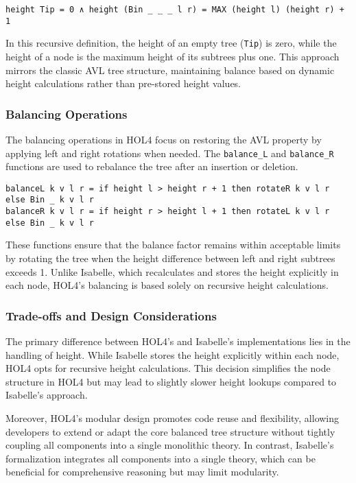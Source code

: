 \documentclass[12pt]{article}
\begin{document}
\begin{itemize}
\begin{verbatim}
height Tip = 0 ∧ height (Bin _ _ _ l r) = MAX (height l) (height r) + 1
\end{verbatim}

In this recursive definition, the height of an empty tree (\texttt{Tip}) is zero, while the height of a node is the maximum height of its subtrees plus one. This approach mirrors the classic AVL tree structure, maintaining balance based on dynamic height calculations rather than pre-stored height values.

\subsubsection{Balancing Operations}
The balancing operations in HOL4 focus on restoring the AVL property by applying left and right rotations when needed. The \texttt{balance\_L} and \texttt{balance\_R} functions are used to rebalance the tree after an insertion or deletion.

\begin{verbatim}
balanceL k v l r = if height l > height r + 1 then rotateR k v l r else Bin _ k v l r
balanceR k v l r = if height r > height l + 1 then rotateL k v l r else Bin _ k v l r
\end{verbatim}

These functions ensure that the balance factor remains within acceptable limits by rotating the tree when the height difference between left and right subtrees exceeds 1. Unlike Isabelle, which recalculates and stores the height explicitly in each node, HOL4’s balancing is based solely on recursive height calculations.

\subsubsection{Trade-offs and Design Considerations}
The primary difference between HOL4’s and Isabelle’s implementations lies in the handling of height. While Isabelle stores the height explicitly within each node, HOL4 opts for recursive height calculations. This decision simplifies the node structure in HOL4 but may lead to slightly slower height lookups compared to Isabelle’s approach.

Moreover, HOL4's modular design promotes code reuse and flexibility, allowing developers to extend or adapt the core balanced tree structure without tightly coupling all components into a single monolithic theory. In contrast, Isabelle's formalization integrates all components into a single theory, which can be beneficial for comprehensive reasoning but may limit modularity.


\end{itemize}
\end{document}
